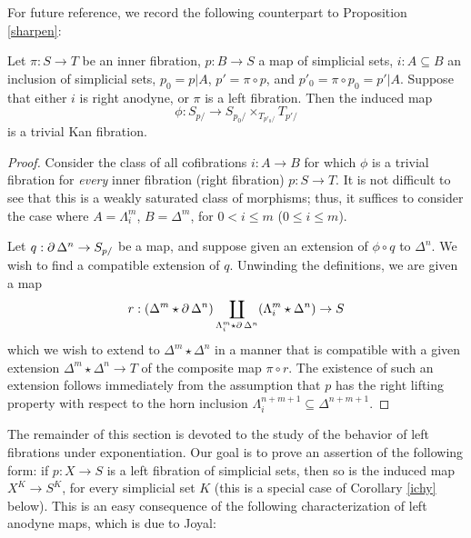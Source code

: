 For future reference, we record the following counterpart to Proposition \ref{sharpen}:

\begin{proposition}[Joyal]\label{sharpen2}
Let $\pi: S \rightarrow T$ be an inner fibration, $p: B \rightarrow S$ a map of simplicial sets,
$i: A \subseteq B$ an inclusion of simplicial sets, $p_0 = p | A$, $p' = \pi \circ p$, and $p'_0 = \pi \circ p_0 = p'|A$. Suppose that either $i$ is right anodyne, or $\pi$ is a left fibration. 
Then the induced map
$$ \phi: S_{p/} \rightarrow S_{p_0/} \times_{ T_{p'_0/}} T_{p'/}$$ is a trivial Kan fibration.
\end{proposition}

\begin{proof}
Consider the class of all cofibrations $i: A \rightarrow B$ for which $\phi$ is a trivial fibration for {\em every} inner fibration (right fibration) $p: S \rightarrow T$. It is not difficult to see that this is a weakly saturated class of morphisms; thus, it suffices to consider the case where $A = \Lambda^m_i$, $B = \Delta^m$, for $0 < i \leq m$ ($0 \leq i \leq m$).

Let $q: \operatorname{\partial} \Delta^n \rightarrow S_{p/}$ be a map, and suppose given an extension of
$\phi \circ q$ to $\Delta^n$. We wish to find a compatible extension of $q$. Unwinding the definitions, we are given a map
$$ r: (\Delta^m \star \operatorname{\partial} \Delta^n) \coprod_{\Lambda^m_i \star \operatorname{\partial} \Delta^n} ( \Lambda^m_i \star \Delta^n) 
\rightarrow S$$ which we wish to extend to $\Delta^m \star \Delta^n$ in a manner that is compatible
with a given extension $\Delta^m \star \Delta^n \rightarrow T$ of the composite map $\pi \circ r$. 
The existence of such an extension follows immediately from the assumption that $p$ has the right lifting property with respect to the horn inclusion $\Lambda^{n+m+1}_i \subseteq \Delta^{n+m+1}$.
\end{proof}

The remainder of this section is devoted to the study of the behavior of left fibrations under exponentiation. Our goal is to prove an assertion of the following form: if $p: X \rightarrow S$ is a left fibration of simplicial sets, then so is the induced map $X^{K} \rightarrow S^{K}$, for every simplicial set $K$ (this is a special case of Corollary \ref{ichy} below). This is an easy consequence of the following characterization of left anodyne maps, which is due to Joyal:

